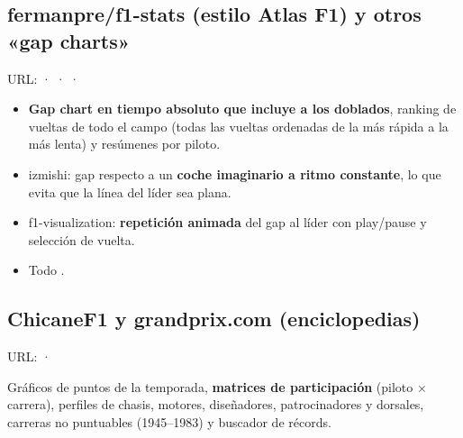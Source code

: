 \subsection{fermanpre/f1-stats (estilo Atlas F1) y otros «gap charts»}

URL: \href{https://github.com/fermanpre/f1-stats}{} · \href{https://github.com/izmishi/f1-lap-chart}{} · \href{https://davidor.github.io/formula1-lap-charts/}{} · \href{https://f1-visualization.vercel.app/}{}

\begin{itemize}
\item \textbf{Gap chart en tiempo absoluto que incluye a los doblados}, ranking de vueltas de todo el campo (todas las vueltas ordenadas de la más rápida a la más lenta) y resúmenes por piloto.
\item izmishi: gap respecto a un \textbf{coche imaginario a ritmo constante}, lo que evita que la línea del líder sea plana.
\item f1-visualization: \textbf{repetición animada} del gap al líder con play/pause y selección de vuelta.
\item Todo \si{}.
\end{itemize}

\subsection{ChicaneF1 y grandprix.com (enciclopedias)}

URL: \href{https://www.chicanef1.com/}{} · \href{https://www.grandprix.com/encyclopedia}{}

Gráficos de puntos de la temporada, \textbf{matrices de participación} (piloto × carrera), perfiles de chasis, motores, diseñadores, patrocinadores y dorsales, carreras no puntuables (1945–1983) y buscador de récords.

